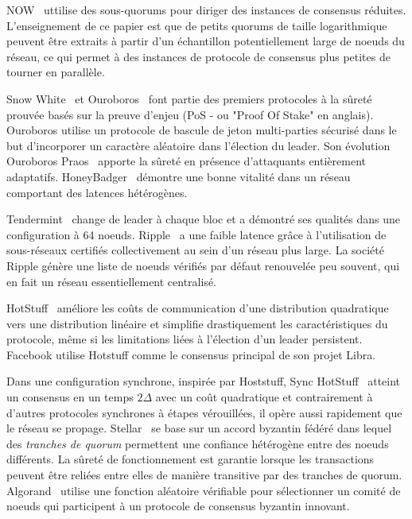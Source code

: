 {NOW~\cite{guerraoui2013highly} uttilise des sous-quorums pour diriger des instances de consensus réduites.
L'enseignement de ce papier est que de petits quorums de taille logarithmique peuvent être extraits à partir d'un
échantillon potentiellement large de noeuds du réseau, ce qui permet à des instances de protocole de consensus plus
petites de tourner en parallèle.

Snow White~\cite{cryptoeprint:2016:919} et Ouroboros~\cite{KiayiasRDO17} font partie des premiers protocoles à la
sûreté prouvée basés sur la preuve d'enjeu (PoS - ou "Proof Of Stake" en anglais). Ouroboros utilise un protocole de
bascule de jeton multi-parties sécurisé dans le but d'incorporer un caractère aléatoire dans l'élection du leader.
Son évolution Ouroboros Praos~\cite{DavidGKR18} apporte la sûreté en présence d'attaquants entièrement adaptatifs.
HoneyBadger~\cite{MillerXCSS16} démontre une bonne vitalité dans un réseau comportant des latences hétérogènes.

Tendermint~\cite{buchman2016tendermint, 1807.04938} change de leader à chaque bloc et a démontré ses qualités dans une
configuration à 64 noeuds. Ripple~\cite{schwartz2014ripple} a une faible latence grâce à l'utilisation de sous-réseaux
certifiés collectivement au sein d'un réseau plus large. La société Ripple génère une liste de noeuds vérifiés par
défaut renouvelée peu souvent, qui en fait un réseau essentiellement centralisé.

HotStuff~\cite{hotstuff,hotstuffpodc} améliore les coûts de communication d'une distribution quadratique vers une
distribution linéaire et simplifie drastiquement les caractéristiques du protocole, même si les limitations liées
à l'élection d'un leader persistent. Facebook utilise Hotstuff comme le consensus principal de son projet Libra.

Dans une configuration synchrone, inspirée par Hoststuff, Sync HotStuff~\cite{synchotstuff} atteint un consensus en
un temps $2\Delta$ avec un coût quadratique et contrairement à d'autres protocoles synchrones à étapes vérouillées, il
opère aussi rapidement que le réseau se propage. Stellar~\cite{mazieres2015stellar} se base sur un accord byzantin
fédéré dans lequel des \emph{tranches de quorum} permettent une confiance hétérogène entre des noeuds différents. La
sûreté de fonctionnement est garantie lorsque les transactions peuvent être reliées entre elles de manière transitive
par des tranches de quorum. Algorand~\cite{GiladHMVZ17} utilise une fonction aléatoire vérifiable pour sélectionner un
comité de noeuds qui participent à un protocole de consensus byzantin innovant.

}

